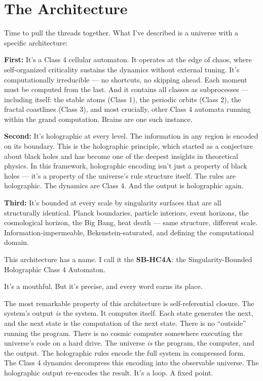 \documentclass[11pt, twoside, openright]{book}
\begin{document}
\section*{The Architecture}

Time to pull the threads together. What I've described is a universe with a specific architecture:

\textbf{First:} It's a Class 4 cellular automaton. It operates at the edge of chaos, where self-organized criticality sustains the dynamics without external tuning. It's computationally irreducible --- no shortcuts, no skipping ahead. Each moment must be computed from the last. And it contains all classes as subprocesses --- including itself: the stable atoms (Class 1), the periodic orbits (Class 2), the fractal coastlines (Class 3), and most crucially, other Class 4 automata running within the grand computation. Brains are one such instance.

\textbf{Second:} It's holographic at every level. The information in any region is encoded on its boundary. This is the holographic principle, which started as a conjecture about black holes and has become one of the deepest insights in theoretical physics. In this framework, holographic encoding isn't just a property of black holes --- it's a property of the universe's rule structure itself. The rules are holographic. The dynamics are Class 4. And the output is holographic again.

\textbf{Third:} It's bounded at every scale by singularity surfaces that are all structurally identical. Planck boundaries, particle interiors, event horizons, the cosmological horizon, the Big Bang, heat death --- same structure, different scale. Information-impermeable, Bekenstein-saturated, and defining the computational domain.

This architecture has a name. I call it the \textbf{SB-HC4A}: the Singularity-Bounded Holographic Class 4 Automaton.

It's a mouthful. But it's precise, and every word earns its place.

The most remarkable property of this architecture is self-referential closure. The system's output \textit{is} the system. It computes itself. Each state generates the next, and the next state is the computation of the next state. There is no ``outside'' running the program. There is no cosmic computer somewhere executing the universe's code on a hard drive. The universe \textit{is} the program, the computer, and the output. The holographic rules encode the full system in compressed form. The Class 4 dynamics decompress this encoding into the observable universe. The holographic output re-encodes the result. It's a loop. A fixed point.
\end{document}
